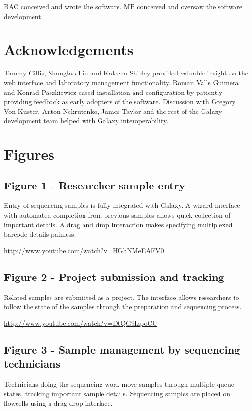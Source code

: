\documentclass[10pt]{bmc_article}
\newenvironment{bmcformat}{\begin{raggedright}\baselineskip20pt\sloppy\setboolean{publ}{false}}{\end{raggedright}\baselineskip20pt\sloppy}
\begin{document}
\begin{bmcformat}
BAC conceived and wrote the software.
MB conceived and oversaw the software development.

\section*{Acknowledgements}
  Tammy Gillis, Shangtao Liu and Kaleena Shirley provided
  valuable insight on the web interface and laboratory management
  functionality. Roman Valls Guimera and Konrad Paszkiewicz eased
  installation and configuration by patiently providing feedback
  as early adopters of the software. Discussion with Gregory Von
  Kuster, Anton Nekrutenko, James Taylor and the rest of the Galaxy
  development team helped with Galaxy interoperability.

{
   }  %


\section*{Figures}
\subsection*{Figure 1 - Researcher sample entry}
Entry of sequencing samples is fully integrated with Galaxy. A
wizard interface with automated completion from previous samples
allows quick collection of important details. A drag and drop
interaction makes specifying multiplexed barcode details painless.

\url{http://www.youtube.com/watch?v=HGhNMeEAFV0}

\subsection*{Figure 2 - Project submission and tracking}
Related samples are submitted as a project. The interface allows
researchers to follow the state of the samples through the
preparation and sequencing process.

\url{http://www.youtube.com/watch?v=DtQG9IzpoCU}

\subsection*{Figure 3 - Sample management by sequencing technicians}
Technicians doing the sequencing work move samples through multiple
queue states, tracking important sample details. Sequencing samples
are placed on flowcells using a drag-drop interface.


\end{bmcformat}
\end{document}

